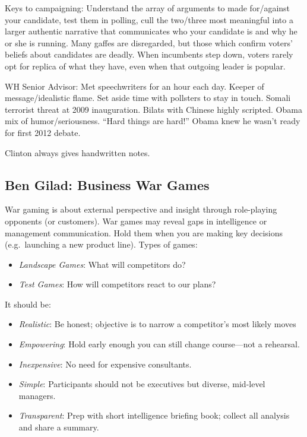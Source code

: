 \documentclass[
]{article}
\begin{document}
Keys to campaigning: Understand the array of arguments to made
for/against your candidate, test them in polling, cull the two/three
most meaningful into a larger authentic narrative that communicates who
your candidate is and why he or she is running. Many gaffes are
disregarded, but those which confirm voters' beliefs about candidates
are deadly. When incumbents step down, voters rarely opt for replica of
what they have, even when that outgoing leader is popular.

WH Senior Advisor: Met speechwriters for an hour each day. Keeper of
message/idealistic flame. Set aside time with pollsters to stay in
touch. Somali terrorist threat at 2009 inauguration. Bilats with Chinese
highly scripted. Obama mix of humor/seriousness. ``Hard things are
hard!'' Obama knew he wasn't ready for first 2012 debate.

Clinton always gives handwritten notes.

\hypertarget{ben-gilad-business-war-games}{%
\subsection{Ben Gilad: Business War
Games}\label{ben-gilad-business-war-games}}

War gaming is about external perspective and insight through
role-playing opponents (or customers). War games may reveal gaps in
intelligence or management communication. Hold them when you are making
key decisions (e.g.~launching a new product line). Types of games:

\begin{itemize}
\item
  \emph{Landscape Games}: What will competitors do?
\item
  \emph{Test Games}: How will competitors react to our plans?
\end{itemize}

It should be:

\begin{itemize}
\item
  \emph{Realistic}: Be honest; objective is to narrow a competitor's
  most likely moves
\item
  \emph{Empowering}: Hold early enough you can still change course---not
  a rehearsal.
\item
  \emph{Inexpensive}: No need for expensive consultants.
\item
  \emph{Simple}: Participants should not be executives but diverse,
  mid-level managers.
\item
  \emph{Transparent}: Prep with short intelligence briefing book;
  collect all analysis and share a summary.
\end{itemize}
\end{document}
